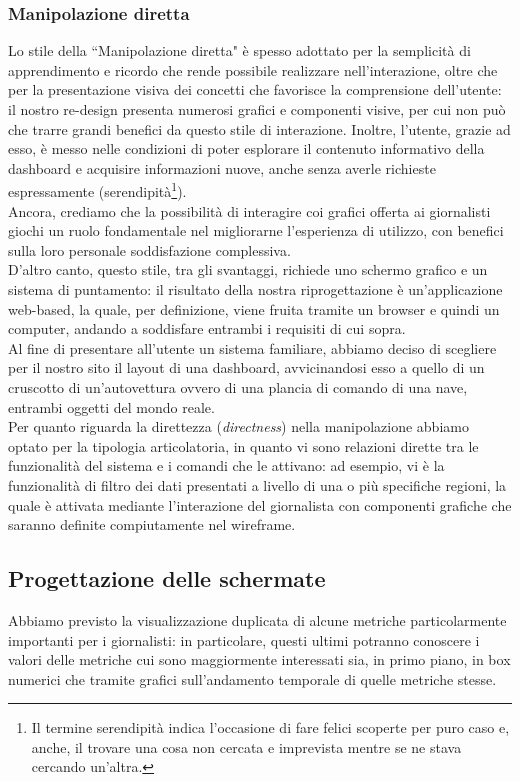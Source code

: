 \subsubsection{Manipolazione diretta}
\label{sss:manipolazione-diretta}
Lo stile della ``Manipolazione diretta" è spesso adottato per la semplicità di apprendimento e ricordo che rende possibile realizzare nell'interazione, oltre che per la presentazione visiva dei concetti che favorisce la comprensione dell'utente: il nostro re-design presenta numerosi grafici e componenti visive, per cui non può che trarre grandi benefici da questo stile di interazione. Inoltre, l'utente, grazie ad esso, è messo nelle condizioni di poter esplorare il contenuto informativo della dashboard e acquisire informazioni nuove, anche senza averle richieste espressamente (serendipità\footnote{Il termine serendipità indica l'occasione di fare felici scoperte per puro caso e, anche, il trovare una cosa non cercata e imprevista mentre se ne stava cercando un'altra.}).\\
Ancora, crediamo che la possibilità di interagire coi grafici offerta ai giornalisti giochi un ruolo fondamentale nel migliorarne l'esperienza di utilizzo, con benefici sulla loro personale soddisfazione complessiva.\\
D'altro canto, questo stile, tra gli svantaggi, richiede uno schermo grafico e un sistema di puntamento: il risultato della nostra riprogettazione è un'applicazione web-based, la quale, per definizione, viene fruita tramite un browser e quindi un computer, andando a soddisfare entrambi i requisiti di cui sopra.\\
Al fine di presentare all'utente un sistema familiare, abbiamo deciso di scegliere per il nostro sito il layout di una dashboard, avvicinandosi esso a quello di un cruscotto di un'autovettura ovvero di una plancia di comando di una nave, entrambi oggetti del mondo reale.\\
Per quanto riguarda la direttezza (\textit{directness}) nella manipolazione abbiamo optato per la tipologia articolatoria, in quanto vi sono relazioni dirette tra le funzionalità del sistema e i comandi che le attivano: ad esempio, vi è la funzionalità di filtro dei dati presentati a livello di una o più specifiche regioni, la quale è attivata mediante l'interazione del giornalista con componenti grafiche che saranno definite compiutamente nel wireframe.

\subsection{Progettazione delle schermate}
\label{ss:progettazione-schermate}
Abbiamo previsto la visualizzazione duplicata di alcune metriche particolarmente importanti per i giornalisti: in particolare, questi ultimi potranno conoscere i valori delle metriche cui sono maggiormente interessati sia, in primo piano, in box numerici che tramite grafici sull'andamento temporale di quelle metriche stesse.

